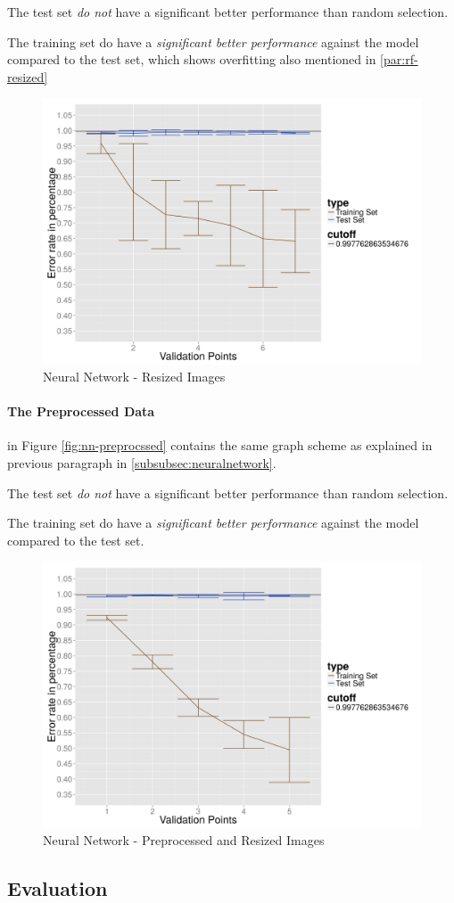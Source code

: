 The test set \emph{do not} have a significant better performance than random selection.

The training set do have a \emph{significant better performance} against the model compared to the test set, which shows overfitting also mentioned in \ref{par:rf-resized}

\begin{figure}
  \centering
  \includegraphics[width=0.9\linewidth]{Images/DNNraw}
  \caption{Neural Network - Resized Images}
  \label{fig:nn-resized}
\end{figure}

\paragraph{The Preprocessed Data}
in Figure \ref{fig:nn-preprocssed} contains the same graph scheme as explained in previous paragraph in \ref{subsubsec:neuralnetwork}. 

The test set \emph{do not} have a significant better performance than random selection.

The training set do have a \emph{significant better performance} against the model compared to the test set.

\begin{figure}
  \centering
  \includegraphics[width=0.9\linewidth]{Images/DNNpreprocessed}
  \caption{Neural Network - Preprocessed and Resized Images}
  \label{fig:nn-preprocessed}
\end{figure}

\subsection{Evaluation}


\label{subsec:evaluation}